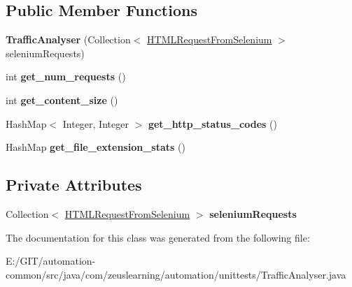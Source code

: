 \subsection*{Public Member Functions}
\begin{DoxyCompactItemize}
\item 
\hypertarget{classcom_1_1zeuslearning_1_1automation_1_1unittests_1_1TrafficAnalyser_aec9d1b7938b04524058d8237d0a98846}{}\label{classcom_1_1zeuslearning_1_1automation_1_1unittests_1_1TrafficAnalyser_aec9d1b7938b04524058d8237d0a98846} 
{\bfseries Traffic\+Analyser} (Collection$<$ \hyperlink{classcom_1_1zeuslearning_1_1automation_1_1unittests_1_1HTMLRequestFromSelenium}{H\+T\+M\+L\+Request\+From\+Selenium} $>$ selenium\+Requests)
\item 
\hypertarget{classcom_1_1zeuslearning_1_1automation_1_1unittests_1_1TrafficAnalyser_a5491e738e6d5c81aa8651950f500ed20}{}\label{classcom_1_1zeuslearning_1_1automation_1_1unittests_1_1TrafficAnalyser_a5491e738e6d5c81aa8651950f500ed20} 
int {\bfseries get\+\_\+num\+\_\+requests} ()
\item 
\hypertarget{classcom_1_1zeuslearning_1_1automation_1_1unittests_1_1TrafficAnalyser_a3768723e1b4de8b95be9c4b60ffe29d3}{}\label{classcom_1_1zeuslearning_1_1automation_1_1unittests_1_1TrafficAnalyser_a3768723e1b4de8b95be9c4b60ffe29d3} 
int {\bfseries get\+\_\+content\+\_\+size} ()
\item 
\hypertarget{classcom_1_1zeuslearning_1_1automation_1_1unittests_1_1TrafficAnalyser_a077afb5622ad8ee7475605817fffb867}{}\label{classcom_1_1zeuslearning_1_1automation_1_1unittests_1_1TrafficAnalyser_a077afb5622ad8ee7475605817fffb867} 
Hash\+Map$<$ Integer, Integer $>$ {\bfseries get\+\_\+http\+\_\+status\+\_\+codes} ()
\item 
\hypertarget{classcom_1_1zeuslearning_1_1automation_1_1unittests_1_1TrafficAnalyser_a190800ce4906c024534d7ce1b21ffd4e}{}\label{classcom_1_1zeuslearning_1_1automation_1_1unittests_1_1TrafficAnalyser_a190800ce4906c024534d7ce1b21ffd4e} 
Hash\+Map {\bfseries get\+\_\+file\+\_\+extension\+\_\+stats} ()
\end{DoxyCompactItemize}
\subsection*{Private Attributes}
\begin{DoxyCompactItemize}
\item 
\hypertarget{classcom_1_1zeuslearning_1_1automation_1_1unittests_1_1TrafficAnalyser_a43236143accab2a7bb61ff731510d509}{}\label{classcom_1_1zeuslearning_1_1automation_1_1unittests_1_1TrafficAnalyser_a43236143accab2a7bb61ff731510d509} 
Collection$<$ \hyperlink{classcom_1_1zeuslearning_1_1automation_1_1unittests_1_1HTMLRequestFromSelenium}{H\+T\+M\+L\+Request\+From\+Selenium} $>$ {\bfseries selenium\+Requests}
\end{DoxyCompactItemize}


The documentation for this class was generated from the following file\+:\begin{DoxyCompactItemize}
\item 
E\+:/\+G\+I\+T/automation-\/common/src/java/com/zeuslearning/automation/unittests/Traffic\+Analyser.\+java\end{DoxyCompactItemize}
